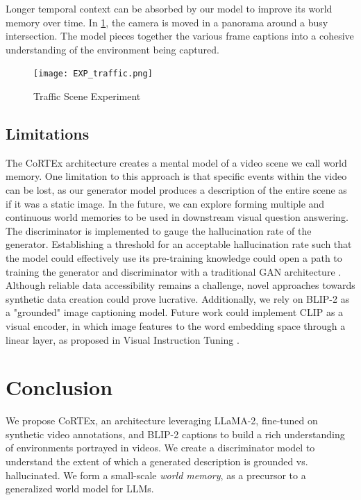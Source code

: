 \documentclass[conference]{IEEEtran}
\begin{document}
Longer temporal context can be absorbed by our model to improve its world memory over time. In \ref{fig:traffic}, the camera is moved in a panorama around a busy intersection. The model pieces together the various frame captions into a cohesive understanding of the environment being captured.

\begin{figure}[H]
\centering
\texttt{[image: EXP\_traffic.png]}
\caption{Traffic Scene Experiment}
\label{fig:traffic}
\end{figure}

\subsection{Limitations}

The CoRTEx architecture creates a mental model of a video scene we call world memory. One limitation to this approach is that specific events within the video can be lost, as our generator model produces a description of the entire scene as if it was a static image. In the future, we can explore forming multiple and continuous world memories to be used in downstream visual question answering. The discriminator is implemented to gauge the hallucination rate of the generator. Establishing a threshold for an acceptable hallucination rate such that the model could effectively use its pre-training knowledge could open a path to training the generator and discriminator with a traditional GAN architecture \cite{goodfellow2014generative}. Although reliable data accessibility remains a challenge, novel approaches towards synthetic data creation could prove lucrative. Additionally, we rely on BLIP-2 as a "grounded" image captioning model. Future work could implement CLIP as a visual encoder, in which image features to the word embedding space through a linear layer, as proposed in Visual Instruction Tuning \cite{liu2023visual}.

\section{Conclusion}

We propose CoRTEx, an architecture leveraging LLaMA-2, fine-tuned on synthetic video annotations, and BLIP-2 captions to build a rich understanding of environments portrayed in videos. We create a discriminator model to understand the extent of which a generated description is grounded vs. hallucinated. We form a small-scale \textit{world memory}, as a precursor to a generalized world model for LLMs. 

\newpage


\end{document}
